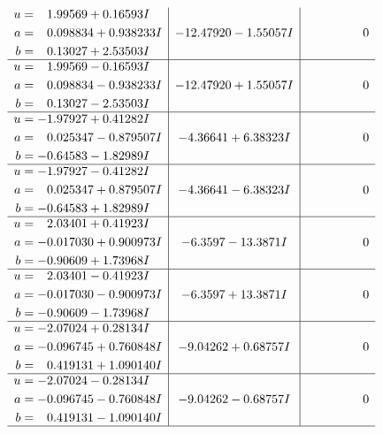 \documentclass[1p]{elsarticle_modified}
\theoremstyle{definition}
\begin{document}
$$\begin{array}{c|c|c}
\begin{aligned}
u &= \phantom{-}1.99569 + 0.16593 I \\
a &= \phantom{-}0.098834 + 0.938233 I \\
b &= \phantom{-}0.13027 + 2.53503 I\end{aligned}
 & -12.47920 - 1.55057 I & \phantom{-0.000000 } 0 \\ \hline\begin{aligned}
u &= \phantom{-}1.99569 - 0.16593 I \\
a &= \phantom{-}0.098834 - 0.938233 I \\
b &= \phantom{-}0.13027 - 2.53503 I\end{aligned}
 & -12.47920 + 1.55057 I & \phantom{-0.000000 } 0 \\ \hline\begin{aligned}
u &= -1.97927 + 0.41282 I \\
a &= \phantom{-}0.025347 - 0.879507 I \\
b &= -0.64583 - 1.82989 I\end{aligned}
 & -4.36641 + 6.38323 I & \phantom{-0.000000 } 0 \\ \hline\begin{aligned}
u &= -1.97927 - 0.41282 I \\
a &= \phantom{-}0.025347 + 0.879507 I \\
b &= -0.64583 + 1.82989 I\end{aligned}
 & -4.36641 - 6.38323 I & \phantom{-0.000000 } 0 \\ \hline\begin{aligned}
u &= \phantom{-}2.03401 + 0.41923 I \\
a &= -0.017030 + 0.900973 I \\
b &= -0.90609 + 1.73968 I\end{aligned}
 & -6.3597 - 13.3871 I & \phantom{-0.000000 } 0 \\ \hline\begin{aligned}
u &= \phantom{-}2.03401 - 0.41923 I \\
a &= -0.017030 - 0.900973 I \\
b &= -0.90609 - 1.73968 I\end{aligned}
 & -6.3597 + 13.3871 I & \phantom{-0.000000 } 0 \\ \hline\begin{aligned}
u &= -2.07024 + 0.28134 I \\
a &= -0.096745 + 0.760848 I \\
b &= \phantom{-}0.419131 + 1.090140 I\end{aligned}
 & -9.04262 + 0.68757 I & \phantom{-0.000000 } 0 \\ \hline\begin{aligned}
u &= -2.07024 - 0.28134 I \\
a &= -0.096745 - 0.760848 I \\
b &= \phantom{-}0.419131 - 1.090140 I\end{aligned}
 & -9.04262 - 0.68757 I & \phantom{-0.000000 } 0\\
 \hline 
 \end{array}$$\newpage\newpage\renewcommand{\arraystretch}{1}
\end{document}
